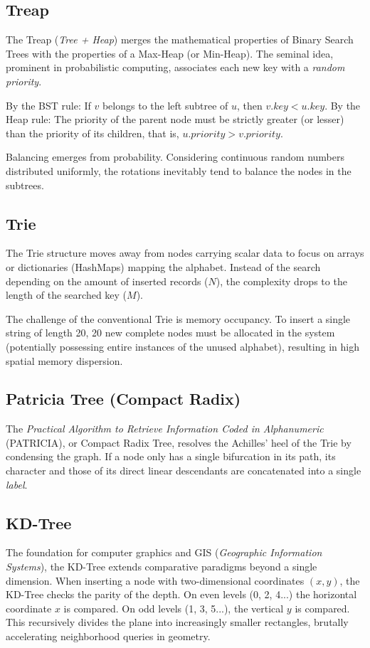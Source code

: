 \documentclass[12pt,a4paper]{article}
\begin{document}
\subsection{Treap}
The Treap (\textit{Tree + Heap}) merges the mathematical properties of Binary Search Trees with the properties of a Max-Heap (or Min-Heap). The seminal idea, prominent in probabilistic computing, associates each new key with a \textit{random priority}.

By the BST rule: If $v$ belongs to the left subtree of $u$, then $v.key < u.key$. By the Heap rule: The priority of the parent node must be strictly greater (or lesser) than the priority of its children, that is, $u.priority > v.priority$.

Balancing emerges from probability. Considering continuous random numbers distributed uniformly, the rotations inevitably tend to balance the nodes in the subtrees.

\subsection{Trie}
The Trie structure moves away from nodes carrying scalar data to focus on arrays or dictionaries (HashMaps) mapping the alphabet. Instead of the search depending on the amount of inserted records ($N$), the complexity drops to the length of the searched key ($M$). 

The challenge of the conventional Trie is memory occupancy. To insert a single string of length 20, 20 new complete nodes must be allocated in the system (potentially possessing entire instances of the unused alphabet), resulting in high spatial memory dispersion.

\subsection{Patricia Tree (Compact Radix)}
The \textit{Practical Algorithm to Retrieve Information Coded in Alphanumeric} (PATRICIA), or Compact Radix Tree, resolves the Achilles' heel of the Trie by condensing the graph. If a node only has a single bifurcation in its path, its character and those of its direct linear descendants are concatenated into a single \textit{label}. 

\subsection{KD-Tree}
The foundation for computer graphics and GIS (\textit{Geographic Information Systems}), the KD-Tree extends comparative paradigms beyond a single dimension. When inserting a node with two-dimensional coordinates $(x, y)$, the KD-Tree checks the parity of the depth. On even levels (0, 2, 4...) the horizontal coordinate $x$ is compared. On odd levels (1, 3, 5...), the vertical $y$ is compared. This recursively divides the plane into increasingly smaller rectangles, brutally accelerating neighborhood queries in geometry.
\end{document}
